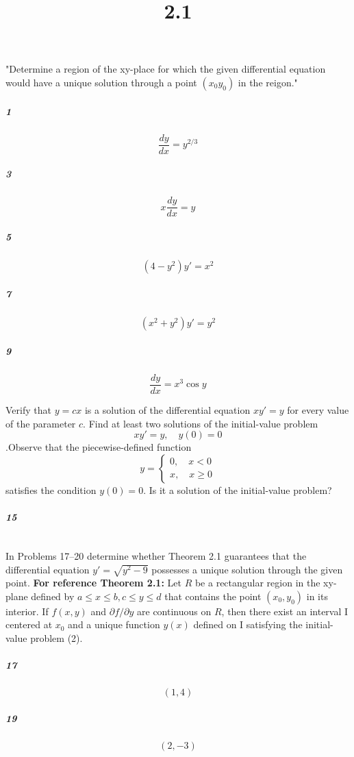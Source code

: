 \documentclass[fleqn]{article}
\title{2.1}
\begin{document}
\maketitle
\pagebreak
 "Determine a region of the xy-place for which the given differential equation would have a unique solution through a point $(x_0  y_0)$ in the reigon."

\subparagraph{1}

\[
\frac{dy}{dx} = y^{2/3}
\]
\vfill



\subparagraph{3}

\[
x\frac{dy}{dx} = y
\]
\vfill


\pagebreak


\subparagraph{5}

\[
(4-y^2)y'=x^2
\]
\vfill



\subparagraph{7}

\[
(x^2 + y^2)y' = y^2
\]
\vfill


\pagebreak


\subparagraph{9}

\[
\frac{dy}{dx} = x^3 \cos y
\]
\vfill

Verify that $y = cx$ is a solution of the differential equation $xy' = y$ for every value of the parameter $c$. Find at least two solutions of the initial-value problem \[ xy' = y, \quad y(0) = 0 \].Observe that the piecewise-defined function \[ y = \begin{cases} 0,\quad x<0 \\ x,\quad x\geq0\end{cases}  \] satisfies the condition $y(0) = 0$. Is it a solution of the initial-value problem?

\subparagraph{15}

\[
\text{}
\]
\vfill


\pagebreak
In Problems 17–20 determine whether Theorem 2.1 guarantees that the differential equation $y' = \sqrt{y^2 - 9}$ possesses a unique solution through the given point. \textbf{For reference Theorem 2.1:} Let $R$ be a rectangular region in the xy-plane defined by $a \le x \le b, c \le y \le d$ that contains the point $(x_0, y_0)$ in its interior. If $f(x, y)$ and $\partial f/\partial y$ are continuous on $R$, then there exist an interval I centered at $x_0$ and a unique function $y(x)$ defined on I satisfying the initial-value problem (2).

\subparagraph{17}

\[
(1, 4)
\]
\vfill



\subparagraph{19}

\[
(2, -3)
\]
\vfill


\pagebreak
\end{document}

